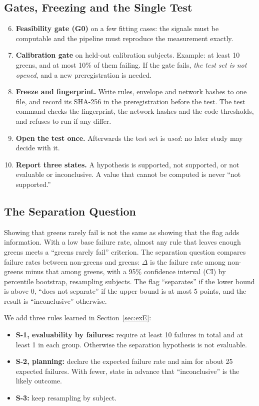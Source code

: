 \documentclass[journal,twoside]{IEEEtran}
\begin{document}
\subsection{Gates, Freezing and the Single Test}
\begin{enumerate}\setcounter{enumi}{5}
\item \textbf{Feasibility gate (G0)} on a few fitting cases: the signals must be computable and the pipeline must
reproduce the measurement exactly.
\item \textbf{Calibration gate} on held-out calibration subjects. Example: at least 10 greens, and at most 10\% of
them failing. If the gate fails, \emph{the test set is not opened}, and a new preregistration is needed.
\item \textbf{Freeze and fingerprint.} Write rules, envelope and network hashes to one file, and record its SHA-256
in the preregistration before the test. The test command checks the fingerprint, the network hashes and the code
thresholds, and refuses to run if any differ.
\item \textbf{Open the test once.} Afterwards the test set is \emph{used}: no later study may decide with it.
\item \textbf{Report three states.} A hypothesis is supported, not supported, or not evaluable or inconclusive. A
value that cannot be computed is never ``not supported.''
\end{enumerate}

\subsection{The Separation Question}\label{sec:separation}
Showing that greens rarely fail is not the same as showing that the flag adds information. With a low base failure
rate, almost any rule that leaves enough greens meets a ``greens rarely fail'' criterion. The separation question
compares failure rates between non-greens and greens: $\Delta$ is the failure rate among non-greens minus that among
greens, with a 95\% confidence interval (CI) by percentile bootstrap, resampling subjects. The flag ``separates'' if
the lower bound is above 0, ``does not separate'' if the upper bound is at most 5 points, and the result is
``inconclusive'' otherwise.

We add three rules learned in Section~\ref{sec:exE}:
\begin{itemize}
\item \textbf{S-1, evaluability by failures:} require at least 10 failures in total and at least 1 in each group.
Otherwise the separation hypothesis is not evaluable.
\item \textbf{S-2, planning:} declare the expected failure rate and aim for about 25 expected failures. With fewer,
state in advance that ``inconclusive'' is the likely outcome.
\item \textbf{S-3:} keep resampling by subject.
\end{itemize}
\end{document}
